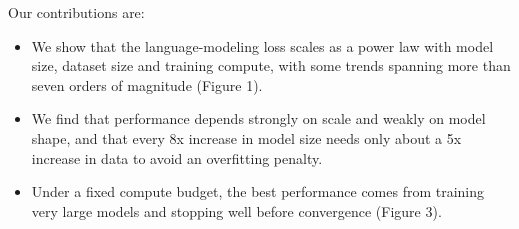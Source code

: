 Our contributions are:

\begin{itemize}
\item We show that the language-modeling loss scales as a power law with model size, dataset size and training compute, with some trends spanning more than seven orders of magnitude  (Figure 1).
\item We find that performance depends strongly on scale and weakly on model shape, and that every 8x increase in model size needs only about a 5x increase in data to avoid an overfitting penalty.
\item Under a fixed compute budget, the best performance comes from training very large models and stopping well before convergence  (Figure 3).
\end{itemize}

